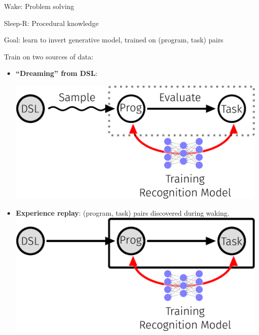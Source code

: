 \documentclass[final]{beamer}
\newlength{\onecolwid}
\begin{document}
\begin{frame}[t]
\begin{columns}[t]
\begin{column}{\onecolwid}
\begin{block}{Wake: Problem solving}

  

\end{block}



\begin{block}{Sleep-R: Procedural knowledge}

  Goal: learn to invert generative model, trained on (program, task) pairs  


Train on two sources of data:

  \begin{itemize}
  \item \textbf{``Dreaming'' from DSL}:

    \includegraphics[width = 20cm]{figures/animation/Sleep-R-2.eps}
  \item \textbf{Experience replay}: (program, task) pairs discovered during waking.
  \includegraphics[width = 20cm]{figures/animation/Sleep-R-1.eps}    
  \end{itemize}
  


\end{block}
\end{column}
\end{columns}
\end{frame}
\end{document}
